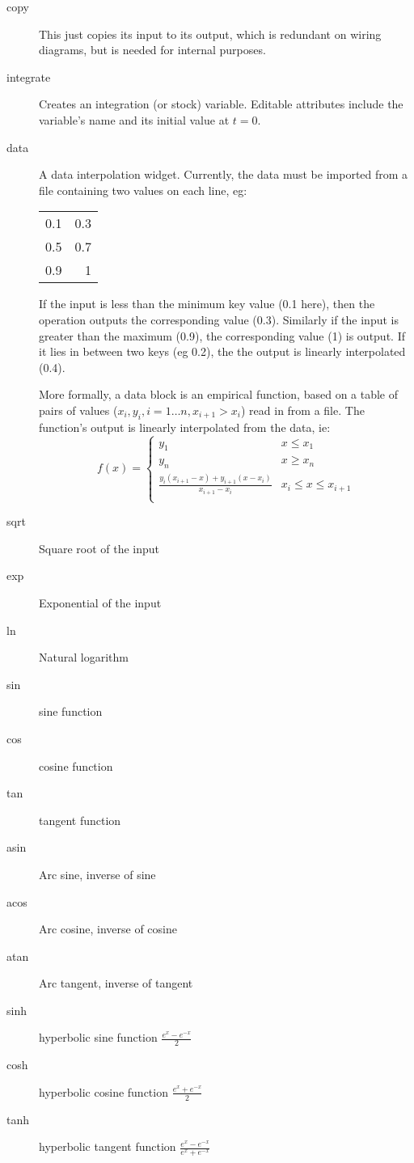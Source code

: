 \begin{description}
\item[copy]\label{op:copy} This just copies its input to its output,
which is redundant on wiring diagrams, but is needed for internal
purposes.

\item[integrate]\label{op:integrate} Creates an integration (or stock)
variable. Editable attributes include the variable's name and its
initial value at $t=0$.

\item[data]\label{op:data} A data interpolation widget. Currently, the
data must be imported from a file containing two values on each line,
eg:
\begin{tabular}{rr}
0.1 &0.3\\
0.5 &0.7\\
0.9 &1\\
\end{tabular}
If the input is less than the minimum key value (0.1 here), then the
operation outputs the corresponding value (0.3). Similarly if the
input is greater than the maximum (0.9), the corresponding value (1)
is output. If it lies in between two keys (eg 0.2), the the output is
linearly interpolated (0.4).

More formally, a data block is an empirical function, based on a table
of pairs of values ($x_i, y_i, i=1\ldots n, x_{i+1}>x_i$) read in from
a file. The function's output is linearly interpolated from the data,
ie:
\begin{displaymath}
f(x) = \left\{
\begin{array}{cl}
y_1 & x\leq x_1\\
y_n & x\geq x_n\\
\frac{y_i(x_{i+1}-x)+y_{i+1}(x-x_i)}{x_{i+1}-x_i} & x_i \leq x \leq
x_{i+1}\\
\end{array}
\right.
\end{displaymath}

\item[sqrt]\label{op:sqrt} Square root of the input

\item[exp]\label{op:exp} Exponential of the input

\item[ln]\label{op:ln} Natural logarithm

\item[sin]\label{op:sin} sine function
\item[cos]\label{op:cos} cosine function
\item[tan]\label{op:tan} tangent function
\item[asin]\label{op:asin} Arc sine, inverse of sine
\item[acos]\label{op:acos} Arc cosine, inverse of cosine
\item[atan]\label{op:atan} Arc tangent, inverse of tangent
\item[sinh]\label{op:sinh} hyperbolic sine function $\frac{e^x-e^{-x}}2$
\item[cosh]\label{op:cosh} hyperbolic cosine function $\frac{e^x+e^{-x}}2$
\item[tanh]\label{op:tanh} hyperbolic tangent function $\frac{e^x-e^{-x}}{e^x+e^{-x}}$


\end{description}
